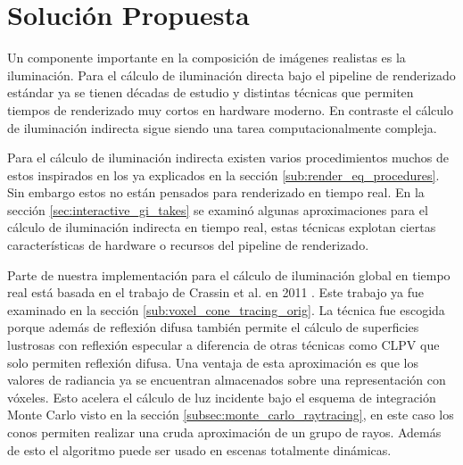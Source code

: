 \chapter{Solución Propuesta}
\label{chap:proposal}

Un componente importante en la composición de imágenes realistas es la iluminación. Para el cálculo de iluminación directa bajo el pipeline de renderizado estándar ya se tienen décadas de estudio y distintas técnicas que permiten tiempos de renderizado muy cortos en hardware moderno. En contraste el cálculo de iluminación indirecta sigue siendo una tarea computacionalmente compleja. 

Para el cálculo de iluminación indirecta existen varios procedimientos muchos de estos inspirados en los ya explicados en la sección \ref{sub:render_eq_procedures}. Sin embargo estos no están pensados para renderizado en tiempo real. En la sección \ref{sec:interactive_gi_takes} se examinó algunas aproximaciones para el cálculo de iluminación indirecta en tiempo real, estas técnicas explotan ciertas características de hardware o recursos del pipeline de renderizado.

Parte de nuestra implementación para el cálculo de iluminación global en tiempo real está basada en el trabajo de Crassin et al. en 2011 \cite{CNSGE11b}. Este trabajo ya fue examinado en la sección \ref{sub:voxel_cone_tracing_orig}. La técnica fue escogida porque además de reflexión difusa también permite el cálculo de superficies lustrosas con reflexión especular a diferencia de otras técnicas como \ac{CLPV} que solo permiten reflexión difusa. Una ventaja de esta aproximación es que los valores de radiancia ya se encuentran almacenados sobre una representación con vóxeles. Esto acelera el cálculo de luz incidente bajo el esquema de integración Monte Carlo visto en la sección \ref{subsec:monte_carlo_raytracing}, en este caso los conos permiten realizar una cruda aproximación de un grupo de rayos. Además de esto el algoritmo puede ser usado en escenas totalmente dinámicas.







